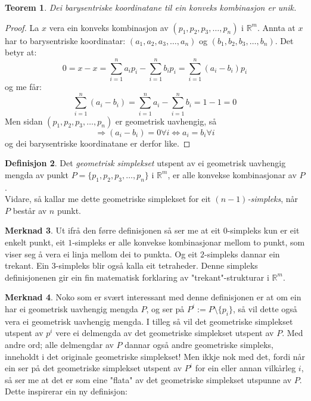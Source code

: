 \documentclass[a4paper, titlepage, 12pt, norsk]{article}
\theoremstyle{plain}
\newtheorem{theorem}{Teorem}[section]
\theoremstyle{definition}
\newtheorem{definition}[theorem]{Definisjon}
\newtheorem{remark}[theorem]{Merknad}
\newcommand{\R}{\mathbb{R}}
\begin{document}
\begin{theorem}
	Dei barysentriske koordinatane til ein konveks kombinasjon er unik.
\end{theorem}
\begin{proof}
	La $x$ vera ein konveks kombinasjon av $(p_1, p_2, p_3, \dots, p_n)$ i $\R^m$. Annta at $x$ har to barysentriske koordinatar: $(a_1, a_2, a_3, \dots, a_n)$ og $(b_1, b_2, b_3, \dots, b_n)$. Det betyr at:
	\begin{equation*}
		0 = x - x = \sum_{i=1}^n a_ip_i - \sum_{i=1}^n b_ip_i=\sum_{i=1}^n (a_i-b_i)p_i
	\end{equation*}
	og me får:
	\begin{equation*}
		\sum_{i=1}^n(a_i-b_i)=\sum_{i=1}^na_i - \sum_{i=1}^nb_i = 1 - 1 = 0
	\end{equation*}
	Men sidan $(p_1, p_2, p_3, \dots, p_n)$ er geometrisk uavhengig, så 
	\begin{equation*}
		\Rightarrow (a_i-b_i)=0\forall i \Leftrightarrow a_i = b_i \forall i
	\end{equation*}
	og dei barysentriske koordinatane er derfor like.
\end{proof}
\begin{definition}
	Det \emph{geometrisk simplekset} utspent av ei geometrisk uavhengig mengda av punkt $P=\{p_1, p_2, p_3, \dots, p_n\}$ i $\R^m$, er alle konvekse kombinasjonar av $P$.
	\\Vidare, så kallar me dette geometriske simplekset for eit \emph{$(n-1)$-simpleks}, når $P$ består av $n$ punkt.
\end{definition}
\begin{remark}
	Ut ifrå den førre definisjonen så ser me at eit $0$-simpleks kun er eit enkelt punkt, eit $1$-simpleks er alle konvekse kombinasjonar mellom to punkt, som viser seg å vera ei linja mellom dei to punkta. Og eit $2$-simpleks dannar ein trekant. Ein $3$-simpleks blir også kalla eit tetraheder. Denne simpleks definisjonenen gir ein fin matematisk forklaring av "trekant"-strukturar i $\R^m$.
\end{remark}
\begin{remark}
	Noko som er svært interessant med denne definisjonen er at om ein har ei geometrisk uavhengig mengda $P$, og ser på $P^i := P \setminus \{p_i\}$, så vil dette også vera ei geometrisk uavhengig mengda. I tilleg så vil det geometriske simplekset utspent av $p^i$ vere ei delmengda av det geometriske simplekset utspent av $P$. Med andre ord; alle delmengdar av $P$ dannar også andre geometriske simpleks, inneholdt i det originale geometriske simplekset! Men ikkje nok med det, fordi når ein ser på det geometriske simplekset utspent av $P^i$ for ein eller annan vilkårleg $i$, så ser me at det er som eine "flata" av det geometriske simplekset utspunne av $P$. Dette inspirerar ein ny definisjon:
\end{remark}
\end{document}
